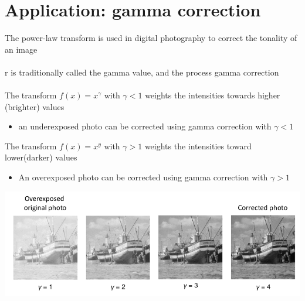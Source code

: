 \documentclass{article}[18pt]
\begin{document}
\section{Application: gamma correction}
The power-law transform is used in digital photography to correct the tonality of an image\\
\\
r is traditionally called the gamma value, and the process gamma correction\\
\\
The transform $f(x)=x^\gamma$ with $\gamma<1$ weights the intensities towards higher (brighter) values
\begin{itemize}
	\item an underexposed photo can be corrected using gamma correction with $\gamma<1$
\end{itemize} 
The transform $f(x)=x^y$ with $\gamma>1$ weights the intensities toward lower(darker) values
\begin{itemize}
	\item An overexposed photo can be corrected using gamma correction with $\gamma>1$
\end{itemize}
\begin{center}
	\includegraphics[scale=0.7]{gamma}
\end{center}
\end{document}
